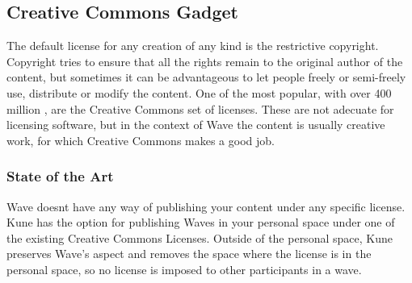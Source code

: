 \subsection{Creative Commons Gadget}

The default license for any creation of any kind is the restrictive copyright. Copyright tries to ensure that all the rights remain to the original author of the content, but sometimes it can be advantageous to let people freely or semi-freely use, distribute or modify the content. One of the most popular, with over 400 million \cite{ref:the_power_of_open}, are the Creative Commons set of licenses. These are not adecuate for licensing software, but in the context of Wave the content is usually creative work, for which Creative Commons makes a good job.

\subsubsection{State of the Art}
Wave doesnt have any way of publishing your content under any specific license. Kune has the option for publishing Waves in your personal space under one of the existing Creative Commons Licenses. Outside of the personal space, Kune preserves Wave's aspect and removes the space where the license is in the personal space, so no license is imposed to other participants in a wave.

